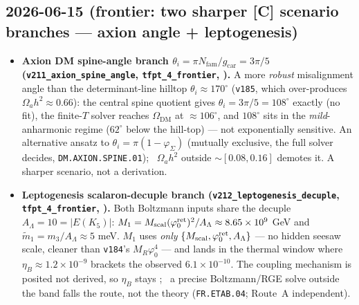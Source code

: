 \documentclass[11pt]{article}
\providecommand{\gcar}{g_{\mathrm{car}}}\providecommand{\Nfam}{N_{\mathrm{fam}}}
\begin{document}
\subsection*{2026-06-15 (frontier: two sharper [C] scenario branches --- axion angle + leptogenesis)}
\begin{itemize}
\item \textbf{Axion DM spine-angle branch $\theta_i=\pi\Nfam/\gcar=3\pi/5$ (\texttt{v211\_axion\_spine\_angle},
  \texttt{tfpt\_4\_frontier}, \mC).} A more \emph{robust} misalignment angle than the determinant-line hilltop
  $\theta_i\approx170^\circ$ (\texttt{v185}, which over-produces $\Omega_a h^2\approx0.66$): the central spine
  quotient gives $\theta_i=3\pi/5=108^\circ$ exactly (no fit), the finite-$T$ solver reaches
  $\Omega_{\mathrm{DM}}$ at ${\approx}106^\circ$, and $108^\circ$ sits in the \emph{mild}-anharmonic regime
  ($62^\circ$ below the hill-top) --- not exponentially sensitive. An alternative ansatz to
  $\theta_i=\pi(1-\varphi_\Sigma)$ (mutually exclusive, the full solver decides, \texttt{DM.AXION.SPINE.01});
  \mX\ $\Omega_a h^2$ outside ${\sim}[0.08,0.16]$ demotes it. A sharper scenario, not a derivation.
\item \textbf{Leptogenesis scalaron-decuple branch (\texttt{v212\_leptogenesis\_decuple},
  \texttt{tfpt\_4\_frontier}, \mC).} Both Boltzmann inputs share the decuple $A_\Lambda=10=|E(K_5)|$:
  $M_1=M_{\mathrm{scal}}(\varphi_0^{\mathrm{ret}})^2/A_\Lambda\approx8.65\times10^9$ GeV and $\tilde m_1=m_3/A_\Lambda\approx5$ meV.
  $M_1$ uses \emph{only} $\{M_{\mathrm{scal}},\varphi_0^{\mathrm{ret}},A_\Lambda\}$ --- no hidden seesaw scale, cleaner than
  \texttt{v184}'s $M_R\varphi_0^4$ --- and lands in the thermal window where $\eta_B\approx1.2\times10^{-9}$
  brackets the observed $6.1\times10^{-10}$. The coupling mechanism is posited not derived, so $\eta_B$ stays
  \mC; \mX\ a precise Boltzmann/RGE solve outside the band falls the route, not the theory
  (\texttt{FR.ETAB.04}; Route~A independent).
\end{itemize}
\end{document}
